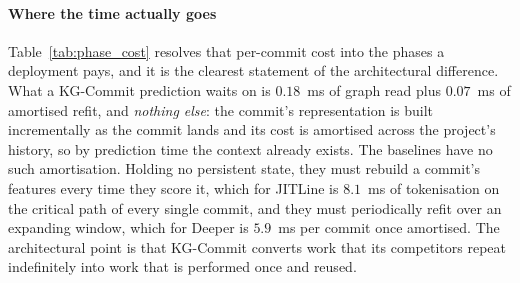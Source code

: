 \documentclass[final,5p,times,twocolumn]{elsarticle}
\theoremstyle{plain}
\begin{document}
\paragraph{Where the time actually goes}
Table~\ref{tab:phase_cost} resolves that per-commit cost into the phases a deployment
pays, and it is the clearest statement of the architectural difference. What a
KG-Commit prediction waits on is $0.18$~ms of graph read plus $0.07$~ms of amortised
refit, and \emph{nothing else}: the commit's representation is built incrementally as
the commit lands and its cost is amortised across the project's history, so by
prediction time the context already exists. The baselines have no such amortisation.
Holding no persistent state, they must rebuild a commit's features every time they
score it, which for JITLine is $8.1$~ms of tokenisation on the critical path of every
single commit, and they must periodically refit over an expanding window, which for
Deeper is $5.9$~ms per commit once amortised. The architectural point is that
KG-Commit converts work that its competitors repeat indefinitely into work that is
performed once and reused.
\end{document}
